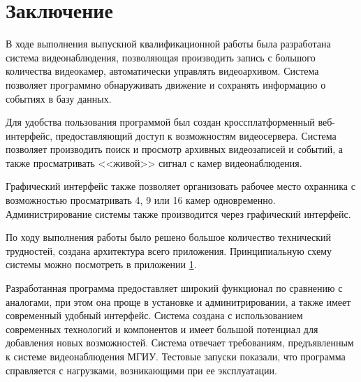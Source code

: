 \chapter*{Заключение}

В ходе выполнения выпускной квалификационной работы была
разработана система видеонаблюдения, позволяющая
производить запись с большого количества видеокамер,
автоматически управлять видеоархивом.
Система позволяет программно обнаруживать движение и сохранять информацию
о событиях в базу данных.

Для удобства пользования программой был создан кроссплатформенный веб-интерфейс,
предоставляющий доступ к возможностям видеосервера. Система позволяет производить поиск
и просмотр архивных видеозаписей и событий, а также просматривать <<живой>> сигнал с камер
видеонаблюдения.

Графический интерфейс также позволяет организовать рабочее место охранника с возможностью
просматривать 4, 9 или 16 камер одновременно. Администрирование системы также производится
через графический интерфейс.

По ходу выполнения работы было решено большое количество технический трудностей,
создана архитектура всего приложения. Принципиальную схему системы можно посмотреть в приложении \hyperlink{scheme.1}{1}.

Разработанная программа предоставляет широкий функционал по сравнению с аналогами, при этом
она проще в установке и админитрировании, а также имеет современный удобный интерфейс.
Система создана с использованием современных технологий и компонентов и имеет большой
потенциал для добавления новых возможностей.
Система отвечает требованиям, предъявленным к системе видеонаблюдения МГИУ.
Тестовые запуски показали, что программа справляется с нагрузками, возникающими при ее эксплуатации.
